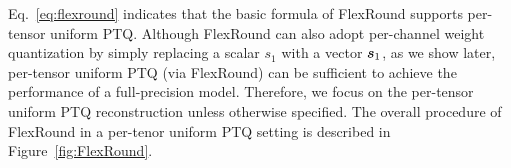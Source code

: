 \documentclass{article}
\theoremstyle{plain}
\theoremstyle{definition}
\theoremstyle{remark}
\begin{document}
Eq.~\ref{eq:flexround} indicates that the basic formula of FlexRound supports per-tensor uniform PTQ. Although FlexRound can also adopt per-channel weight quantization by simply replacing a scalar $s_1$ with a vector ${\bm{s}}_1$, as we show later, per-tensor uniform PTQ (via FlexRound) %
can be sufficient to achieve the performance of a full-precision model. 
Therefore, we focus on the per-tensor uniform PTQ reconstruction unless otherwise specified. The overall procedure of FlexRound in a per-tenor uniform PTQ setting is described in Figure~\ref{fig:FlexRound}.

\end{document}
